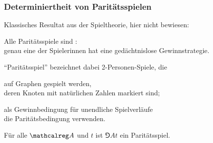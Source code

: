 \begin{frame}
  \frametitle{Determiniertheit von Paritätsspielen}

  Klassisches Resultat aus der Spieltheorie, hier nicht bewiesen:

  \begin{Satz}
    Alle Paritätsspiele sind :\\
    genau eine der Spielerinnen hat eine \textup{gedächtnislose} Gewinnstrategie.%
    \label{thm:gedaechtnislos_determiniert}
  \end{Satz}


  \par\bigskip
  "`Paritätsspiel"' bezeichnet dabei 2-Personen-Spiele, die
  \begin{Itemize}
    \item
      auf Graphen gespielt werden, \\
      deren Knoten mit natürlichen Zahlen markiert sind;
    \item
      als Gewinnbedingung für unendliche Spielverläufe \\
      die Paritätsbedingung verwenden.
  \end{Itemize}
  \parI
  Für alle $\Aut{A}$ und $t$ ist $\Game{A}{t}$ ein Paritätsspiel.
  
\end{frame}


